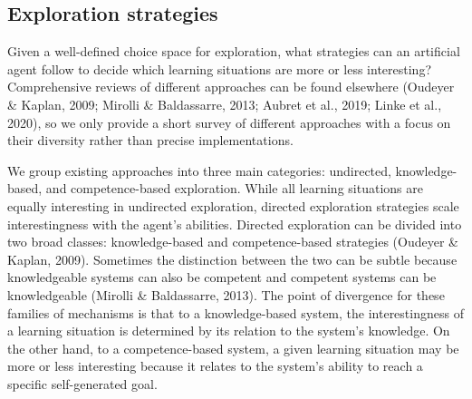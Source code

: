 \subsection{Exploration strategies}\label{sec:exploration-strategies}
Given a well-defined choice space for exploration, what strategies can an artificial agent follow to decide which learning situations are more or less interesting? Comprehensive reviews of different approaches can be found elsewhere (Oudeyer \& Kaplan, 2009; Mirolli \& Baldassarre, 2013; Aubret et al., 2019; Linke et al., 2020), so we only provide a short survey of different approaches with a focus on their diversity rather than precise implementations. 

We group existing approaches into three main categories: undirected, knowledge-based, and competence-based exploration. While all learning situations are equally interesting in undirected exploration, directed exploration strategies scale interestingness with the agent’s abilities. Directed exploration can be divided into two broad classes: knowledge-based and competence-based strategies (Oudeyer \& Kaplan, 2009). Sometimes the distinction between the two can be subtle because knowledgeable systems can also be competent and competent systems can be knowledgeable (Mirolli \& Baldassarre, 2013). The point of divergence for these families of mechanisms is that to a knowledge-based system, the interestingness of a learning situation is determined by its relation to the system’s knowledge. On the other hand, to a competence-based system, a given learning situation may be more or less interesting because it relates to the system’s ability to reach a specific self-generated goal.


